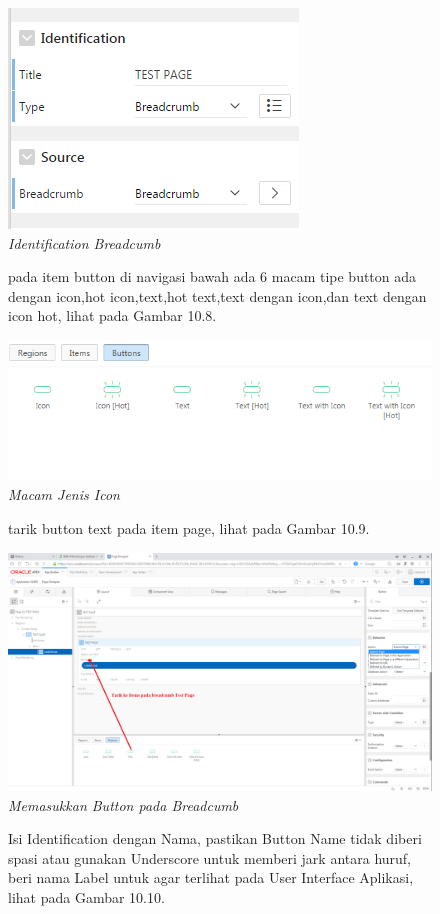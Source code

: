 \begin{enumerate}
\begin{figure}
        \centering
        \includegraphics[scale=0.7]{figures/bab10/7.png}
        \caption{\textit{Identification Breadcumb}}
        \label{Identification Breadcumb}
    \end{figure}
	\begin{figure}
	\item pada item button di navigasi bawah ada 6 macam tipe button ada dengan icon,hot icon,text,hot text,text dengan icon,dan text dengan icon hot, lihat pada Gambar 10.8.
	
        \centering
        \includegraphics[scale=0.55]{figures/bab10/8.png}
        \caption{\textit{Macam Jenis Icon}}
        \label{Macam Jenis Icon}
    \end{figure}
	\begin{figure}
	\item tarik button text pada item page, lihat pada Gambar 10.9.
	
        \centering
        \includegraphics[scale=0.22]{figures/bab10/15.png}
        \caption{\textit{Memasukkan Button pada Breadcumb}}
        \label{Memasukkan Button Pada Breadcumb}
    \end{figure}
	\begin{figure}
	\item Isi Identification dengan Nama, pastikan Button Name tidak diberi spasi atau gunakan Underscore untuk memberi jark antara huruf, beri nama Label untuk agar terlihat pada User Interface Aplikasi, lihat pada Gambar 10.10.
	

\end{figure}
\end{enumerate}
